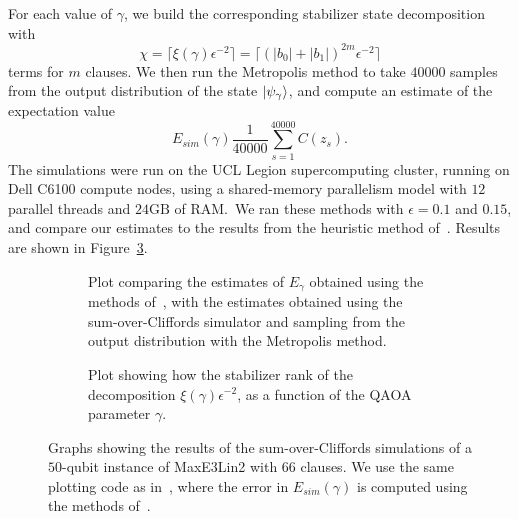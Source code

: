 For each value of $\gamma$, we build the corresponding stabilizer state decomposition with
\[\chi = \lceil \xi\left(\gamma\right)\epsilon^{-2}\rceil = \lceil \left(\left|b_{0}\right|+\left|b_{1}\right|\right)^{2m}\epsilon^{-2}\rceil \]
terms for $m$ clauses. We then run the Metropolis method to take $40000$ samples from the output distribution of the state $\ket{\psi_{\gamma}}$, and compute an estimate of the expectation value
\begin{equation}
E_{sim}\left(\gamma\right)\frac{1}{40000}\sum_{s=1}^{40000}C\left(z_{s}\right).
\end{equation}
The simulations were run on the UCL Legion supercomputing cluster, running on Dell C6100 compute nodes, using a shared-memory parallelism model with $12$ parallel threads and $24\mathrm{GB}$ of RAM.\ We ran these methods with $\epsilon=0.1$ and $0.15$, and compare our estimates to the results from the heuristic method of~\cite{VandenNest2009}. Results are shown in Figure~\ref{fig:qaoa_results}.
\begin{figure}[H]
\centering
\begin{subfigure}[t]{0.8\textwidth}
\begin{scaletikzpicturetowidth}{\textwidth}

\end{scaletikzpicturetowidth}
\caption{Plot comparing the estimates of $E_{\gamma}$ obtained using the methods of~\cite{VandenNest2009}, with the estimates obtained using the sum-over-Cliffords simulator and sampling from the output distribution with the Metropolis method.}\label{fig:qaoa_results_comparison}
\end{subfigure}
\begin{subfigure}[t]{0.8\textwidth}
\begin{scaletikzpicturetowidth}{\textwidth}

\end{scaletikzpicturetowidth}
\caption{Plot showing how the stabilizer rank of the decomposition $\xi\left(\gamma\right)\epsilon^{-2}$, as a function of the QAOA parameter $\gamma$.}\label{fig:qaoa_srank}
\end{subfigure}
\caption{Graphs showing the results of the sum-over-Cliffords simulations of a $50$-qubit instance of MaxE3Lin2 with $66$ clauses. We use the same plotting code as in~\cite{Bravyi2018}, where the error in $E_{sim}\left(\gamma\right)$ is computed using the methods of~\cite{Wolff2004}.}\label{fig:qaoa_results}
\end{figure}
